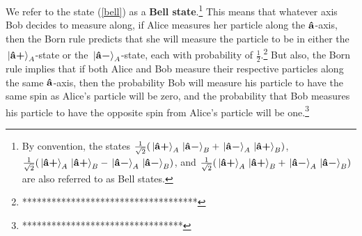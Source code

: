We refer to the state (\ref{bell}) as a \textbf{Bell state}.\footnote{By convention, the states $ \frac{1}{\sqrt{2}}(\ket*{\vb{\hat{{a}}}\bm{+}}_A\ket*{\vb{\hat{{a}}}\bm{-}}_B+\ket*{\vb{\hat{{a}}}\bm{-}}_A\ket*{\vb{\hat{{a}}}\bm{+}}_B)$, $ \frac{1}{\sqrt{2}}(\ket*{\vb{\hat{{a}}}\bm{+}}_A\ket*{\vb{\hat{{a}}}\bm{+}}_B-\ket*{\vb{\hat{{a}}}\bm{-}}_A\ket*{\vb{\hat{{a}}}\bm{-}}_B)$, and $ \frac{1}{\sqrt{2}}(\ket*{\vb{\hat{{a}}}\bm{+}}_A\ket*{\vb{\hat{{a}}}\bm{+}}_B+\ket*{\vb{\hat{{a}}}\bm{-}}_A\ket*{\vb{\hat{{a}}}\bm{-}}_B)$ are also referred to as Bell states.}
This means that whatever axis Bob decides to measure along, if Alice measures her particle along the $\vb{\hat{{a}}}$-axis, then the Born rule predicts that she will measure the particle to be in either the $\ket*{\vb{\hat{{a}}}\bm{+}}_A$-state or the $\ket*{\vb{\hat{{a}}}\bm{-}}_A$-state, each with probability of $\frac{1}{2}$.\footnote{************************************} But also, the Born rule implies that if both Alice and Bob measure their respective particles along the same $\vb{\hat{{a}}}$-axis, then the probability Bob will measure his particle to have the same spin as Alice's particle will be zero, and the probability that Bob measures his particle to have the opposite spin from Alice's particle will be one.\footnote{*********************************} 